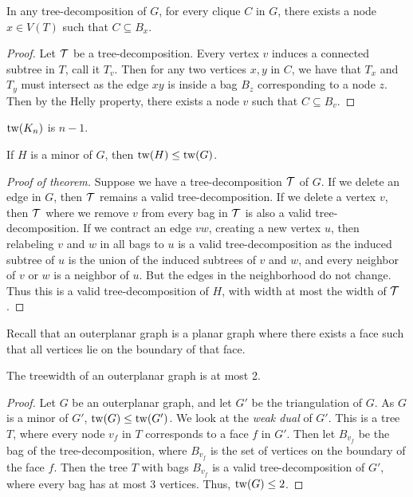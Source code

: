 \begin{theorem}\label{thm:clique}
	In any tree-decomposition of \(G\), for every clique \(C\) in \(G\), there exists a node \(x \in V(T)\) such that \(C \subseteq B_x\). 
\end{theorem}

\begin{proof}
	Let \(\mathcal{T}\) be a tree-decomposition. Every vertex \(v\) induces a connected subtree in \(T\), call it \(T_v\). Then for any two vertices \(x, y\) in \(C\), we have that \(T_x\) and \(T_y\) must intersect as the edge \(xy\) is inside a bag \(B_z\) corresponding to a node \(z\). Then by the Helly property, there exists a node \(v\) such that \(C \subseteq B_v\).
\end{proof}

\begin{corollary}\label{cor:complete_tw}
	\(\operatorname{tw}(K_n)\) is \(n-1\). 
\end{corollary}

\begin{theorem}\label{thm:tw_minor_closure}
	If \(H\) is a minor of \(G\), then \(\operatorname{tw}(H) \leq \operatorname{tw}(G)\). 
\end{theorem}
\begin{proof}[Proof of theorem]
	Suppose we have a tree-decomposition \(\mathcal{T}\) of \(G\). If we delete an edge in \(G\), then \(\mathcal{T}\) remains a valid tree-decomposition. If we delete a vertex \(v\), then \(\mathcal{T}\) where we remove \(v\) from every bag in \(\mathcal{T}\) is also a valid tree-decomposition. If we contract an edge \(vw\), creating a new vertex \(u\), then relabeling \(v\) and \(w\) in all bags to \(u\) is a valid tree-decomposition as the induced subtree of \(u\) is the union of the induced subtrees of \(v\) and \(w\), and every neighbor of \(v\) or \(w\) is a neighbor of \(u\). But the edges in the neighborhood do not change. Thus this is a valid tree-decomposition of \(H\), with width at most the width of \(\mathcal{T}\).
\end{proof}

Recall that an outerplanar graph is a planar graph where there exists a face such that all vertices lie on the boundary of that face. 
\begin{lemma}\label{ex:tw_outerplanar}
	The treewidth of an outerplanar graph is at most 2.
\end{lemma}
\begin{proof}
	Let \(G\) be an outerplanar graph, and let \(G'\) be the triangulation of \(G\). As \(G\) is a minor of \(G'\), \(\operatorname{tw}(G) \leq \operatorname{tw}(G')\). We look at the \textit{weak dual} of \(G'\). This is a tree \(T\), where every node \(v_f\) in \(T\) corresponds to a face \(f\) in \(G'\). Then let \(B_{v_f}\) be the bag of the tree-decomposition, where \(B_{v_f}\) is the set of vertices on the boundary of the face \(f\). Then the tree \(T\) with bags \(B_{v_f}\) is a valid tree-decomposition of \(G'\), where every bag has at most 3 vertices. Thus, \(\operatorname{tw}(G) \leq 2\). 
\end{proof}

